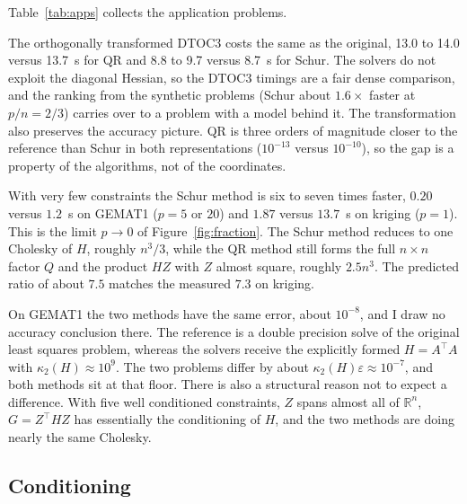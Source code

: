 \documentclass[10pt]{article}
\newcommand{\kap}{\kappa_2}
\begin{document}
Table~\ref{tab:apps} collects the application problems.

The orthogonally transformed DTOC3 costs the same as the original, 13.0 to 14.0 versus
13.7~s for QR and 8.8 to 9.7 versus 8.7~s for Schur. The solvers do not exploit the diagonal
Hessian, so the DTOC3 timings are a fair dense comparison, and the ranking from the
synthetic problems (Schur about $1.6\times$ faster at $p/n=2/3$) carries over to a
problem with a model behind it. The transformation also preserves the accuracy
picture. QR is three orders of magnitude closer to the reference than Schur in both
representations ($10^{-13}$ versus $10^{-10}$), so the gap is a property of the
algorithms, not of the coordinates.

With very few constraints the Schur method is six to seven times faster, $0.20$ versus
$1.2$~s on GEMAT1 ($p=5$ or $20$) and $1.87$ versus $13.7$~s on kriging ($p=1$). This is the
limit $p\to0$ of Figure~\ref{fig:fraction}. The Schur method reduces to one Cholesky of
$H$, roughly $n^3/3$, while the QR method still forms the full $n\times n$ factor $Q$ and
the product $HZ$ with $Z$ almost square, roughly $2.5n^3$. The predicted ratio of about
$7.5$ matches the measured $7.3$ on kriging.

On GEMAT1 the two methods have the same error, about $10^{-8}$, and I draw no accuracy
conclusion there. The reference is a double precision solve of the original least squares
problem, whereas the solvers receive the explicitly formed $H=A^\top A$ with
$\kap(H)\approx10^9$. The two problems differ by about $\kap(H)\varepsilon\approx10^{-7}$,
and both methods sit at that floor. There is also a structural reason not to expect a
difference. With five well conditioned constraints, $Z$ spans almost all of $\mathbb R^n$,
$G=Z^\top HZ$ has essentially the conditioning of $H$, and the two methods are doing nearly
the same Cholesky.

\subsection{Conditioning}\label{sec:cond}
\end{document}
